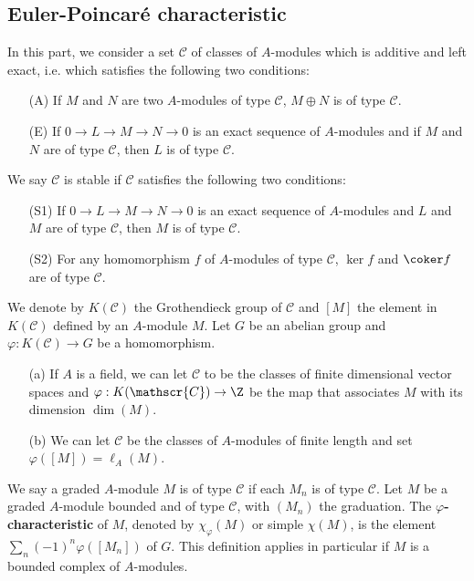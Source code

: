 \subsection{Euler-Poincar\'e characteristic}
In this part, we consider a set $\mathscr{C}$ of classes of $A$-modules which is additive and left exact, i.e. which satisfies the following two conditions:
\begin{itemize}
\item[(A)] If $M$ and $N$ are two $A$-modules of type $\mathscr{C}$, $M\oplus N$ is of type $\mathscr{C}$.
\item[(E)] If $0\to L\to M\to N\to 0$ is an exact sequence of $A$-modules and if $M$ and $N$ are of type $\mathscr{C}$, then $L$ is of type $\mathscr{C}$.
\end{itemize}
We say $\mathscr{C}$ is stable if $\mathscr{C}$ satisfies the following two conditions:
\begin{itemize}
\item[(S1)] If $0\to L\to M\to N\to 0$ is an exact sequence of $A$-modules and $L$ and $M$ are of type $\mathscr{C}$, then $M$ is of type $\mathscr{C}$. 
\item[(S2)] For any homomorphism $f$ of $A$-modules of type $\mathscr{C}$, $\ker f$ and $\coker f$ are of type $\mathscr{C}$.
\end{itemize}
We denote by $K(\mathscr{C})$ the Grothendieck group of $\mathscr{C}$ and $[M]$ the element in $K(\mathscr{C})$ defined by an $A$-module $M$. Let $G$ be an abelian group and $\varphi:K(\mathscr{C})\to G$ be a homomorphism.
\begin{example}
\mbox{}
\begin{itemize}
\item[(a)] If $A$ is a field, we can let $\mathscr{C}$ to be the classes of finite dimensional vector spaces and $\varphi:K(\mathscr{C})\to\Z$ be the map that associates $M$ with its dimension $\dim(M)$.
\item[(b)] We can let $\mathscr{C}$ be the classes of $A$-modules of finite length and set $\varphi([M])=\ell_A(M)$.
\end{itemize}
\end{example}
We say a graded $A$-module $M$ is of type $\mathscr{C}$ if each $M_n$ is of type $\mathscr{C}$. Let $M$ be a graded $A$-module bounded and of type $\mathscr{C}$, with $(M_n)$ the graduation. The \textbf{$\varphi$-characteristic} of $M$, denoted by $\chi_{\varphi}(M)$ or simple $\chi(M)$, is the element $\sum_n(-1)^n\varphi([M_n])$ of $G$. This definition applies in particular if $M$ is a bounded complex of $A$-modules.
